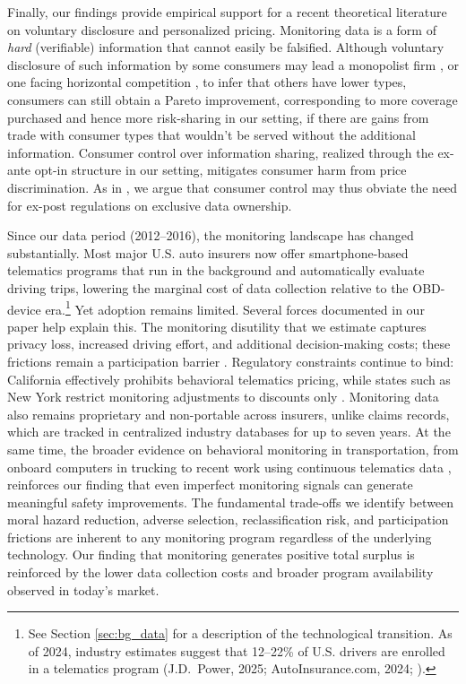 Finally, our findings provide empirical support for a recent theoretical literature on voluntary disclosure and personalized pricing.
Monitoring data is a form of \textit{hard} (verifiable) information that cannot easily be falsified. Although voluntary disclosure of such information by some consumers may lead a monopolist firm \parencite{pram2020disclosure}, or one facing horizontal competition \parencite{alv2022voluntarydisclosure}, to infer that others have lower types, consumers can still obtain a Pareto improvement, corresponding to more coverage purchased and hence more risk-sharing in our setting, if there are gains from trade with consumer types that wouldn't be served without the additional information. Consumer control over information sharing, realized through the ex-ante opt-in structure in our setting, mitigates consumer harm from price discrimination. As in \textcites{ichihashi2020online, montes2019value}, we argue that consumer control may thus obviate the need for ex-post regulations on exclusive data ownership.

Since our data period (2012--2016), the monitoring landscape has changed substantially. Most major U.S. auto insurers now offer smartphone-based telematics programs that run in the background and automatically evaluate driving trips, lowering the marginal cost of data collection relative to the OBD-device era.\footnote{See Section \ref{sec:bg_data} for a description of the technological transition. As of 2024, industry estimates suggest that 12--22\% of U.S. drivers are enrolled in a telematics program (J.D.\ Power, 2025; AutoInsurance.com, 2024; \cite{ben2023privacy}).} Yet adoption remains limited. Several forces documented in our paper help explain this. The monitoring disutility that we estimate captures privacy loss, increased driving effort, and additional decision-making costs; these frictions remain a participation barrier \parencites{athey2017digital}{ben2023privacy}. Regulatory constraints continue to bind: California effectively prohibits behavioral telematics pricing, while states such as New York restrict monitoring adjustments to discounts only \parencite{ben2023privacy}. Monitoring data also remains proprietary and non-portable across insurers, unlike claims records, which are tracked in centralized industry databases for up to seven years. At the same time, the broader evidence on behavioral monitoring in transportation, from onboard computers in trucking \parencite{Hubbard2000} to recent work using continuous telematics data \parencites{soleymanian2019sensor}{jin2023re}, reinforces our finding that even imperfect monitoring signals can generate meaningful safety improvements. The fundamental trade-offs we identify between moral hazard reduction, adverse selection, reclassification risk, and participation frictions are inherent to any monitoring program regardless of the underlying technology. Our finding that monitoring generates positive total surplus is reinforced by the lower data collection costs and broader program availability observed in today's market.

